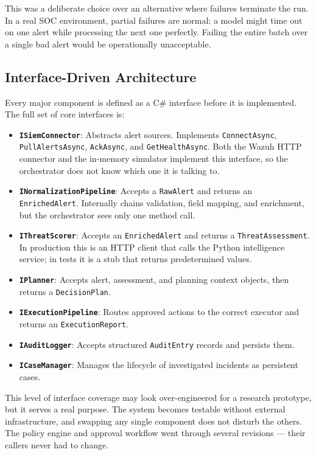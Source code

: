 This was a deliberate choice over an alternative where failures terminate the run. In a real SOC environment, partial failures are normal: a model might time out on one alert while processing the next one perfectly. Failing the entire batch over a single bad alert would be operationally unacceptable.

\subsection{Interface-Driven Architecture}

Every major component is defined as a C\# interface before it is implemented. The full set of core interfaces is:

\begin{itemize}
    \item \textbf{\texttt{ISiemConnector}}: Abstracts alert sources. Implements \texttt{ConnectAsync}, \texttt{PullAlertsAsync}, \texttt{AckAsync}, and \texttt{GetHealthAsync}. Both the Wazuh HTTP connector and the in-memory simulator implement this interface, so the orchestrator does not know which one it is talking to.
    \item \textbf{\texttt{INormalizationPipeline}}: Accepts a \texttt{RawAlert} and returns an \texttt{EnrichedAlert}. Internally chains validation, field mapping, and enrichment, but the orchestrator sees only one method call.
    \item \textbf{\texttt{IThreatScorer}}: Accepts an \texttt{EnrichedAlert} and returns a \texttt{ThreatAssessment}. In production this is an HTTP client that calls the Python intelligence service; in tests it is a stub that returns predetermined values.
    \item \textbf{\texttt{IPlanner}}: Accepts alert, assessment, and planning context objects, then returns a \texttt{DecisionPlan}.
    \item \textbf{\texttt{IExecutionPipeline}}: Routes approved actions to the correct executor and returns an \texttt{ExecutionReport}.
    \item \textbf{\texttt{IAuditLogger}}: Accepts structured \texttt{AuditEntry} records and persists them.
    \item \textbf{\texttt{ICaseManager}}: Manages the lifecycle of investigated incidents as persistent cases.
\end{itemize}

This level of interface coverage may look over-engineered for a research prototype, but it serves a real purpose. The system becomes testable without external infrastructure, and swapping any single component does not disturb the others. The policy engine and approval workflow went through several revisions --- their callers never had to change.


